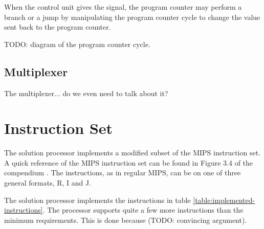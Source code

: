 When the control unit gives the signal, the program counter may perform a branch or a jump by manipulating the program counter cycle to change the value sent back to the program counter.

TODO: diagram of the program counter cycle.

\subsection{Multiplexer}

The multiplexer... do we even need to talk about it?

\section{Instruction Set}

The solution processor implements a modified subset of the MIPS instruction set.
A quick reference of the MIPS instruction set can be found in Figure 3.4 of the compendium \cite{compendium}.
The instructions, as in regular MIPS, can be on one of three general formats, R, I and J.

The solution processor implements the instructions in table \ref{table:implemented-instructions}.
The processor supports quite a few more instructions than the minimum requirements.
This is done because (TODO: convincing argument).

